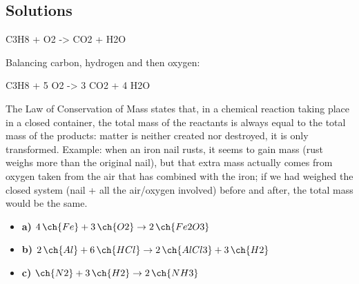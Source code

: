 \documentclass[11pt,a4paper]{article}
\begin{document}

\subsection*{Solutions}

\begin{solucioneng}
\begin{reaction*}
    C3H8 + O2 -> CO2 + H2O
\end{reaction*}
Balancing carbon, hydrogen and then oxygen:
\begin{reaction*}
    C3H8 + 5 O2 -> 3 CO2 + 4 H2O
\end{reaction*}
\end{solucioneng}

\begin{solucioneng}
The Law of Conservation of Mass states that, in a chemical reaction taking place in a closed container, the total mass of the reactants is always equal to the total mass of the products: matter is neither created nor destroyed, it is only transformed. Example: when an iron nail rusts, it seems to gain mass (rust weighs more than the original nail), but that extra mass actually comes from oxygen taken from the air that has combined with the iron; if we had weighed the closed system (nail + all the air/oxygen involved) before and after, the total mass would be the same.
\end{solucioneng}

\begin{solucioneng}
\begin{itemize}
    \item \textbf{a)} $4\,\ch{Fe} + 3\,\ch{O2} \rightarrow 2\,\ch{Fe2O3}$
    \item \textbf{b)} $2\,\ch{Al} + 6\,\ch{HCl} \rightarrow 2\,\ch{AlCl3} + 3\,\ch{H2}$
    \item \textbf{c)} $\ch{N2} + 3\,\ch{H2} \rightarrow 2\,\ch{NH3}$
\end{itemize}
\end{solucioneng}
\end{document}
